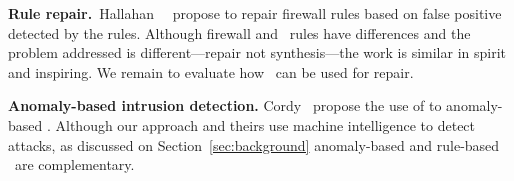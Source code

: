 \documentclass[sigconf,review, anonymous]{acmart}
\begin{document}


\noindent
\textbf{Rule repair.}~Hallahan~\etal{}~\cite{8102263} propose to
repair firewall rules based on false positive detected by the
rules. Although firewall and \nids\ rules have differences and the
problem addressed is different---repair not synthesis---the work is
similar in spirit and inspiring. We remain to evaluate how \tname\ can
be used for repair.

\noindent
\textbf{Anomaly-based intrusion detection.}
Cordy~\etal{}\cite{cordy-etal-issta19} propose the use of
 to 
anomaly-based \nids. Although our approach and theirs use machine
intelligence to detect attacks, as discussed on
Section~\ref{sec:background} anomaly-based and rule-based \nids\ are
complementary.
\end{document}
